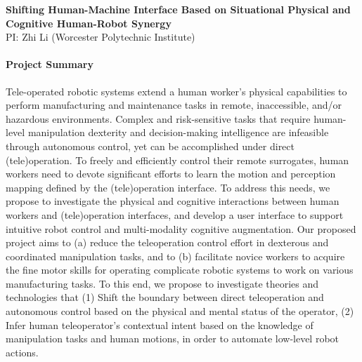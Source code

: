 \pagebreak

\begin{center}
	{\Large \bf Shifting Human-Machine Interface Based on Situational Physical and Cognitive Human-Robot Synergy}\\
    \vspace{4pt}
   	{\large PI: Zhi Li (Worcester Polytechnic Institute)}
\end{center}

\vspace{1 em}

\paragraph*{\Large Project Summary} 
Tele-operated robotic systems extend a human worker's physical capabilities to perform manufacturing and maintenance tasks in remote, inaccessible, and/or hazardous environments. Complex and risk-sensitive tasks that require human-level manipulation dexterity and decision-making intelligence are infeasible through autonomous control, yet can be accomplished under direct (tele)operation. To freely and efficiently control their remote surrogates, human workers need to devote significant efforts to learn the motion and perception mapping defined by the (tele)operation interface. To address this needs, we propose to investigate the physical and cognitive interactions between human workers and (tele)operation interfaces, and develop a user interface to support intuitive robot control and multi-modality cognitive augmentation. Our proposed project aims to (a) reduce the teleoperation control effort in dexterous and coordinated manipulation tasks, and to (b) facilitate novice workers to acquire the fine motor skills for operating complicate robotic systems to work on various manufacturing tasks. To this end, we propose to investigate theories and technologies that (1) Shift the boundary between direct teleoperation and autonomous control based on the physical and mental status of the operator, (2) Infer human teleoperator's contextual intent based on the knowledge of manipulation tasks and human motions, in order to automate low-level robot actions. 

\vspace{0.5 em}

